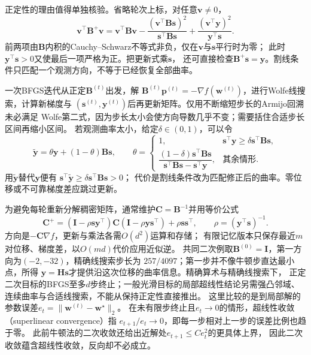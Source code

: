 正定性的理由值得单独核验。省略轮次上标，对任意$\bm v\neq0$，
\[
 \bm v^\top\bm B^+\bm v
 =\bm v^\top\bm B\bm v
 -\frac{(\bm v^\top\bm B\bm s)^2}{\bm s^\top\bm B\bm s}
 +\frac{(\bm v^\top\bm y)^2}{\bm y^\top\bm s}.
\]
前两项由$\bm B$内积的Cauchy--Schwarz不等式非负，仅在$\bm v$与$\bm s$平行时为零；
此时$\bm y^\top\bm s>0$又使最后一项严格为正。把更新式乘$\bm s$，
还可直接检查$\bm B^+\bm s=\bm y$。割线条件只匹配一个观测方向，不等于已经恢复全部曲率。

一次BFGS迭代从正定$\bm B^{(t)}$出发，解
$\bm B^{(t)}\bm p^{(t)}=-\nabla f(\bm w^{(t)})$，进行Wolfe线搜索，计算新梯度与
$(\bm s^{(t)},\bm y^{(t)})$后再更新矩阵。仅用不断缩短步长的Armijo回溯未必满足
Wolfe第二式，因为步长太小会使方向导数几乎不变；需要括住合适步长区间再缩小区间。
若观测曲率太小，给定$\delta\in(0,1)$，可以令
\[
 \widetilde{\bm y}=\theta\bm y+(1-\theta)\bm B\bm s,\qquad
 \theta=
 \begin{cases}
 1,&\bm s^\top\bm y\geq\delta\bm s^\top\bm B\bm s,\\
 \dfrac{(1-\delta)\bm s^\top\bm B\bm s}
 {\bm s^\top\bm B\bm s-\bm s^\top\bm y},&\text{其余情形}.
 \end{cases}
\]
用$\widetilde{\bm y}$替代$\bm y$便有
$\bm s^\top\widetilde{\bm y}\geq\delta\bm s^\top\bm B\bm s>0$；
代价是割线条件改为匹配修正后的曲率。零位移或不可靠梯度差应跳过更新。

为避免每轮重新分解稠密矩阵，通常维护$\bm C=\bm B^{-1}$并用等价公式
\[
 \bm C^+=(\bm I-\rho\bm s\bm y^\top)\bm C
          (\bm I-\rho\bm y\bm s^\top)+\rho\bm s\bm s^\top,
 \qquad \rho=(\bm y^\top\bm s)^{-1}.
\]
方向是$-\bm C\nabla f$，更新与乘法各需$O(d^2)$运算和存储；
有限记忆版本只保存最近$m$对位移、梯度差，以$O(md)$代价应用近似逆。
共同二次例取$\bm B^{(0)}=\bm I$，第一方向为$(-2,-32)$，精确线搜索步长为
$257/4097$；第一步并不像牛顿步直达最小点，所得
$\bm y=\bm H\bm s$才提供沿这次位移的曲率信息。精确算术与精确线搜索下，
正定二次目标的BFGS至多$d$步终止；一般光滑目标的局部超线性结论另需强凸邻域、
连续曲率与合适线搜索，不能从保持正定性直接推出。
这里比较的是到局部解的参数误差$e_t=\|\bm w^{(t)}-\bm w^\star\|_2$。
在未有限步终止且$e_t\to0$的情形，超线性收敛（superlinear convergence）指
$e_{t+1}/e_t\to0$，即每一步相对上一步的误差比例也趋于零。
此前牛顿法的二次收敛还给出近解处$e_{t+1}\leq Ce_t^2$的更具体上界，
因此二次收敛蕴含超线性收敛，反向却不必成立。

